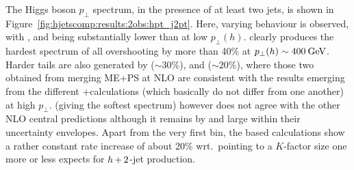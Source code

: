 The Higgs boson $p_\perp$ spectrum, in the presence of at least two
jets, is shown in Figure~\ref{fig:hjetscomp:results:2obs:hpt_j2pt}.
Here, varying behaviour is observed, with \MGaMC, \Sherpa and \Hej
being substantially lower than \Powheg at low $p_\perp(h)$. \Hej
clearly produces the hardest spectrum of all overshooting \Powheg by
more than 40\% at $p_\perp(h)\sim400\text{\:GeV}$. Harder tails are also
generated by \Sherpa \NNLOPS ($\sim30\%$), \Sherpa \MEPSatNLO and
\MGaMC ($\sim20\%$), where those two obtained from merging ME+PS at
NLO are consistent with the results emerging from the different
\GoSam+\Sherpa calculations (which basically do not differ from one
another) at high $p_\perp$. \Herwig (giving the softest spectrum)
however does not agree with the other NLO central predictions although
it remains by and large within their uncertainty envelopes. Apart from
the very first bin, the \GoSam based calculations show a rather
constant rate increase of about 20\% wrt.~\Powheg pointing to a
$K$-factor size one more or less expects for $h\!\text{~+~}\!2$-jet production.

